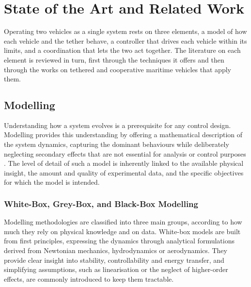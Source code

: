 
\chapter{State of the Art and Related Work}
\label{chapter:state_of_the_art}

Operating two vehicles as a single system rests on three elements, a model of how each vehicle and the tether behave, a controller that drives each vehicle within its limits, and a coordination that lets the two act together. The literature on each element is reviewed in turn, first through the techniques it offers and then through the works on tethered and cooperative maritime vehicles that apply them.

\section{Modelling}
\label{sec:sota_modeling}

Understanding how a system evolves is a prerequisite for any control design. Modelling provides this understanding by offering a mathematical description of the system dynamics, capturing the dominant behaviours while deliberately neglecting secondary effects that are not essential for analysis or control purposes \cite{modeling_Silva}. The level of detail of such a model is inherently linked to the available physical insight, the amount and quality of experimental data, and the specific objectives for which the model is intended.

\subsection{White-Box, Grey-Box, and Black-Box Modelling}
\label{subsec:sota_modeling_types}
Modelling methodologies are classified into three main groups, according to how much they rely on physical knowledge and on data. White-box models are built from first principles, expressing the dynamics through analytical formulations derived from Newtonian mechanics, hydrodynamics or aerodynamics. They provide clear insight into stability, controllability and energy transfer, and simplifying assumptions, such as linearisation or the neglect of higher-order effects, are commonly introduced to keep them tractable.

